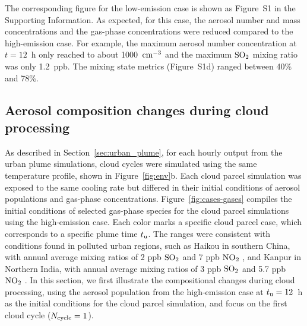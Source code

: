 \documentclass[edeposit,fullpage]{uiucthesis2009}
\begin{document}
The corresponding figure for the low-emission case is shown as
  Figure~S1 in the Supporting Information. As expected, for this case,
  the aerosol number and mass concentrations and the gas-phase
  concentrations were reduced compared to the high-emission case. For
  example, the maximum aerosol number concentration at $t=12$~h only
  reached to about 1000~$\rm cm^{-3}$ and the maximum $\rm SO_2$
  mixing ratio was only 1.2~ppb. The mixing state metrics (Figure~S1d)
  ranged between 40\% and 78\%.

\subsection{Aerosol composition changes during cloud processing}
\label{sec:cloud}
As described in Section~\ref{sec:urban_plume}, for each hourly output
from the urban plume simulations, cloud cycles were simulated using
the same temperature profile, shown in Figure~\ref{fig:env}b.
Each cloud parcel simulation was exposed to the same cooling
  rate but differed in their initial conditions of aerosol populations
  and gas-phase concentrations. Figure~\ref{fig:cases-gases} compiles
  the initial conditions of selected gas-phase species for the cloud
  parcel simulations using the high-emission case. Each color marks a
  specific cloud parcel case, which corresponds to a specific plume
  time $t_{\rm u}$. The ranges were consistent with conditions found
  in polluted urban regions, such as Haikou in southern China, with
  annual average mixing ratios of 2 ppb $\rm SO_2$ and 7 ppb $\rm
  NO_2$ \citep{wang2014spatial}, and Kanpur in Northern India, with
  annual average mixing ratios of 3 ppb $\rm SO_2$ and 5.7 ppb $\rm
  NO_2$ \citep{gaur2014four}. In this section, we first illustrate
the compositional changes during cloud processing, using the aerosol
population from the high-emission case at $t_{\rm u} =12$~h
as the initial conditions for the cloud parcel simulation, and focus
on the first cloud cycle ($N_{\rm cycle}=1$).
\end{document}
